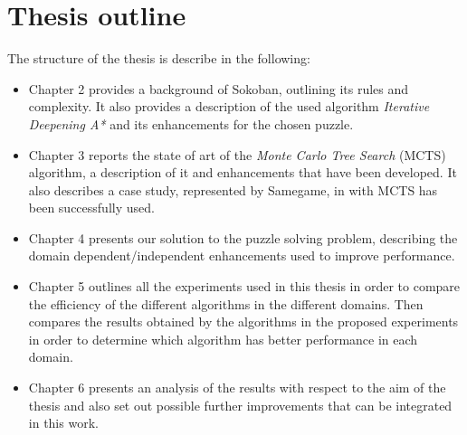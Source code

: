 \section{Thesis outline}
The structure of the thesis is describe in the following:
\begin{itemize}
    \item Chapter 2 provides a background of Sokoban, outlining its rules and complexity. It also provides a description of the used algorithm \textit{Iterative Deepening A*} and its enhancements for the chosen puzzle.
    \item Chapter 3 reports the state of art of the \textit{Monte Carlo Tree Search} (MCTS) algorithm, a description of it and enhancements that have been developed. It also describes a case study, represented by Samegame, in with MCTS has been successfully used.
    \item Chapter 4 presents our solution to the puzzle solving problem, describing the domain dependent/independent enhancements used to improve performance.
    \item Chapter 5 outlines all the experiments used in this thesis in order to compare the efficiency of the different algorithms in the different domains. Then compares the results obtained by the algorithms in the proposed experiments in order to determine which algorithm has better performance in each domain.
    \item Chapter 6 presents an analysis of the results with respect to the aim of the thesis and also set out possible further improvements that can be integrated in this work. 
\end{itemize}